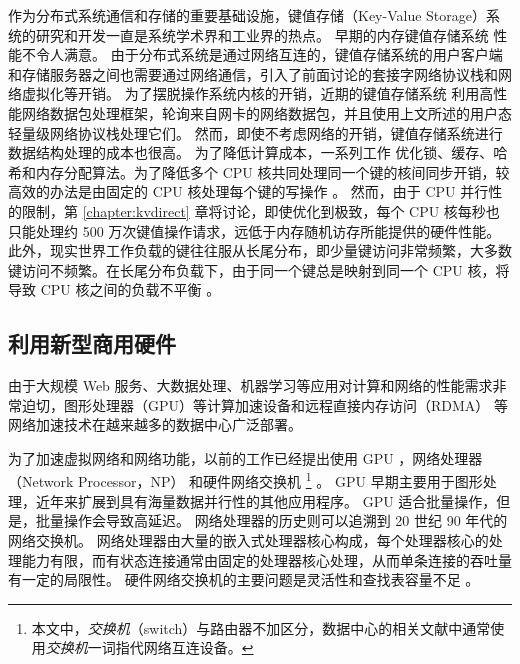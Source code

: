 作为分布式系统通信和存储的重要基础设施，键值存储（Key-Value Storage）系统的研究和开发一直是系统学术界和工业界的热点。
早期的内存键值存储系统 \cite{memcached} 性能不令人满意。
由于分布式系统是通过网络互连的，键值存储系统的用户客户端和存储服务器之间也需要通过网络通信，引入了前面讨论的套接字网络协议栈和网络虚拟化等开销。
为了摆脱操作系统内核的开销，近期的键值存储系统  \cite {kapoor2012chronos,ousterhout2010case,ousterhout2015ramcloud,lim2014mica,li2016full} 利用高性能网络数据包处理框架，轮询来自网卡的网络数据包，并且使用上文所述的用户态轻量级网络协议栈处理它们。
然而，即使不考虑网络的开销，键值存储系统进行数据结构处理的成本也很高。
为了降低计算成本，一系列工作 \cite{mao2012cache,fan2013memc3,li2014algorithmic} 优化锁、缓存、哈希和内存分配算法。为了降低多个 CPU 核共同处理同一个键的核间同步开销，较高效的办法是由固定的 CPU 核处理每个键的写操作 \cite{lim2014mica}。
然而，由于 CPU 并行性的限制，第 \ref{chapter:kvdirect} 章将讨论，即使优化到极致，每个 CPU 核每秒也只能处理约 500 万次键值操作请求，远低于内存随机访存所能提供的硬件性能。
此外，现实世界工作负载的键往往服从长尾分布，即少量键访问非常频繁，大多数键访问不频繁。在长尾分布负载下，由于同一个键总是映射到同一个 CPU 核，将导致 CPU 核之间的负载不平衡 \cite{lim2014mica}。





\subsection{利用新型商用硬件}


由于大规模 Web 服务、大数据处理、机器学习等应用对计算和网络的性能需求非常迫切，图形处理器（GPU）等计算加速设备和远程直接内存访问（RDMA） \cite{infiniband2000infiniband} 等网络加速技术在越来越多的数据中心广泛部署。

为了加速虚拟网络和网络功能，以前的工作已经提出使用 GPU \cite {packetshader}，网络处理器（Network Processor，NP） \cite {cavium,netronome} 和硬件网络交换机 \footnote{本文中，\textit{交换机}（switch）与路由器不加区分，数据中心的相关文献中通常使用\textit{交换机}一词指代网络互连设备。} \cite {duet}。
GPU 早期主要用于图形处理，近年来扩展到具有海量数据并行性的其他应用程序。
GPU 适合批量操作，但是，批量操作会导致高延迟。
网络处理器的历史则可以追溯到 20 世纪 90 年代的网络交换机。
网络处理器由大量的嵌入式处理器核心构成，每个处理器核心的处理能力有限，而有状态连接通常由固定的处理器核心处理，从而单条连接的吞吐量有一定的局限性。
硬件网络交换机的主要问题是灵活性和查找表容量不足 \cite{duet}。

